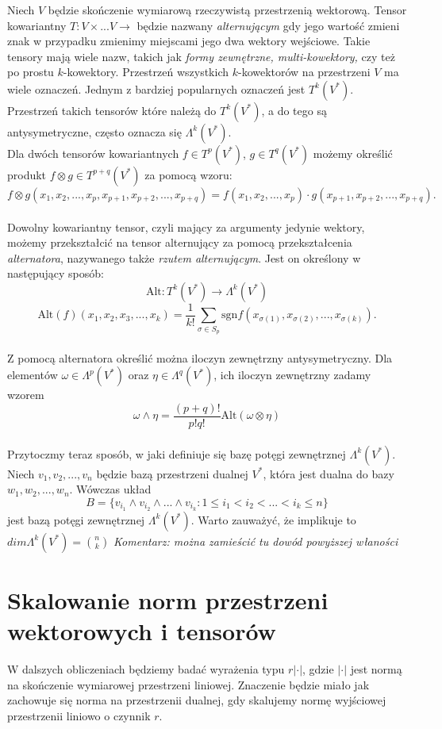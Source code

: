 \documentclass[licencjacka]{pracamgr}
\theoremstyle{definition}
\theoremstyle{definition}
\theoremstyle{plain}
\theoremstyle{plain}
\begin{document}
Niech $V$ będzie skończenie wymiarową rzeczywistą przestrzenią wektorową.
Tensor kowariantny $T:V \times ... V \rightarrow$ będzie nazwany
\emph{alternującym} gdy jego wartość zmieni znak w przypadku zmienimy miejscami
jego dwa wektory wejściowe. Takie tensory mają wiele nazw, takich jak
\emph{formy zewnętrzne, multi-kowektory,} czy też po prostu $k$-kowektory.
Przestrzeń wszystkich $k$-kowektorów na przestrzeni $V$ ma wiele oznaczeń. 
Jednym z bardziej popularnych oznaczeń jest $T^k (V^\ast)$.
Przestrzeń takich tensorów które należą do $T^k (V^\ast)$, a do tego są
antysymetryczne, często oznacza się $\Lambda^k (V^\ast)$. \\

Dla dwóch tensorów kowariantnych
$f \in T^p(V^\ast) $, $g \in T^q(V^\ast) $
możemy określić produkt $f \otimes g \in T^{p+q}(V^\ast) $ za pomocą wzoru:
\[
  f \otimes g(x_1, x_2, ..., x_p, x_{p+1}, x_{p+2}, ... ,x_{p+q}) =
  f(x_1, x_2, ... , x_p) \cdot g(x_{p+1}, x_{p+2}, ... , x_{p+q}).
\] \\

Dowolny kowariantny tensor, czyli mający za argumenty jedynie wektory, możemy
przekształcić na tensor alternujący za pomocą przekształcenia
\emph{alternatora}, nazywanego także \emph{rzutem alternującym}.
Jest on określony w następujący sposób:
\[
\text{Alt}:T^k (V^\ast) \rightarrow  \Lambda^k (V^\ast)
\]
\[
\text{Alt}(f)(x_1, x_2, x_3, ..., x_k) = \frac{1}{k!}
  \sum_{\sigma \in S_p}
     \text{sgn} f(x_{\sigma(1)}, x_{\sigma(2)}, ..., x_{\sigma(k)}).
\] \\

Z pomocą alternatora określić można iloczyn zewnętrzny antysymetryczny. 
Dla elementów $\omega \in \Lambda^p (V^\ast)$ oraz 
$\eta \in \Lambda^q (V^\ast)$, ich iloczyn zewnętrzny zadamy wzorem
\[
  \omega \wedge \eta = \frac{(p+q)!}{p!q!} \text{Alt} (\omega \otimes \eta)
\] \\

Przytoczmy teraz sposób, w jaki definiuje się bazę potęgi zewnętrznej
$\Lambda^k(V^\ast)$. Niech $v_1, v_2, ... , v_n$ będzie bazą przestrzeni dualnej
$V^\ast$, która jest dualna do bazy $w_1, w_2, ..., w_n$.
Wówczas układ
\[
  B = \{ v_{i_1} \wedge v_{i_2} \wedge ... \wedge v_{i_k} : 1 \leq i_1 < i_2 < ... <i_k \leq n \}
\]
jest bazą potęgi zewnętrznej $\Lambda^k(V^\ast)$. Warto zauważyć, że implikuje
 to $dim \Lambda^k ( V^\ast)= \binom{n}{k}$
\emph{Komentarz: można zamieścić tu dowód powyższej właności} \\


\section{Skalowanie norm przestrzeni wektorowych i tensorów}
W dalszych obliczeniach będziemy badać wyrażenia typu $r |\cdot|$, gdzie
$|\cdot|$ jest normą na skończenie wymiarowej przestrzeni liniowej.
Znaczenie będzie miało jak zachowuje się norma na przestrzenii dualnej,
gdy skalujemy normę wyjściowej przestrzenii liniowo o czynnik $r$. \\
\end{document}
